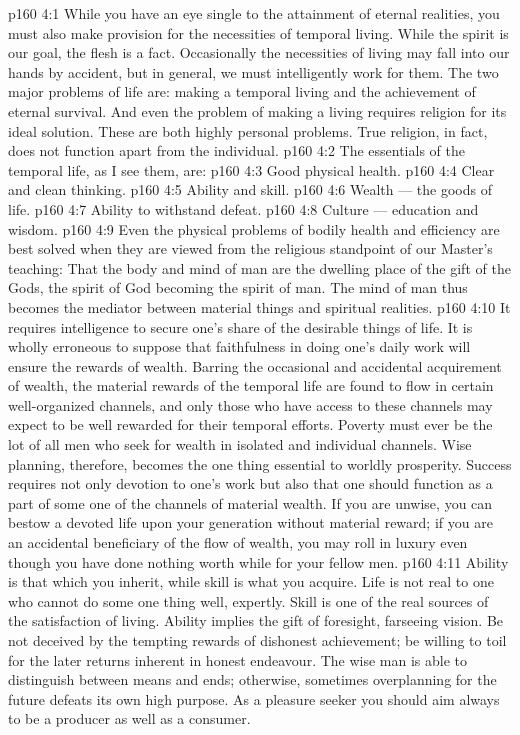 \vs p160 4:1 While you have an eye single to the attainment of eternal realities, you must also make provision for the necessities of temporal living. While the spirit is our goal, the flesh is a fact. Occasionally the necessities of living may fall into our hands by accident, but in general, we must intelligently work for them. The two major problems of life are: making a temporal living and the achievement of eternal survival. And even the problem of making a living requires religion for its ideal solution. These are both highly personal problems. True religion, in fact, does not function apart from the individual.
\vs p160 4:2 \pc The essentials of the temporal life, as I see them, are:
\vs p160 4:3 \bibnobreakspace Good physical health.
\vs p160 4:4 \bibnobreakspace Clear and clean thinking.
\vs p160 4:5 \bibnobreakspace Ability and skill.
\vs p160 4:6 \bibnobreakspace Wealth --- the goods of life.
\vs p160 4:7 \bibnobreakspace Ability to withstand defeat.
\vs p160 4:8 \bibnobreakspace Culture --- education and wisdom.
\vs p160 4:9 \pc Even the physical problems of bodily health and efficiency are best solved when they are viewed from the religious standpoint of our Master’s teaching: That the body and mind of man are the dwelling place of the gift of the Gods, the spirit of God becoming the spirit of man. The mind of man thus becomes the mediator between material things and spiritual realities.
\vs p160 4:10 \pc It requires intelligence to secure one’s share of the desirable things of life. It is wholly erroneous to suppose that faithfulness in doing one’s daily work will ensure the rewards of wealth. Barring the occasional and accidental acquirement of wealth, the material rewards of the temporal life are found to flow in certain well\hyp{}organized channels, and only those who have access to these channels may expect to be well rewarded for their temporal efforts. Poverty must ever be the lot of all men who seek for wealth in isolated and individual channels. Wise planning, therefore, becomes the one thing essential to worldly prosperity. Success requires not only devotion to one’s work but also that one should function as a part of some one of the channels of material wealth. If you are unwise, you can bestow a devoted life upon your generation without material reward; if you are an accidental beneficiary of the flow of wealth, you may roll in luxury even though you have done nothing worth while for your fellow men.
\vs p160 4:11 Ability is that which you inherit, while skill is what you acquire. Life is not real to one who cannot do some one thing well, expertly. Skill is one of the real sources of the satisfaction of living. Ability implies the gift of foresight, farseeing vision. Be not deceived by the tempting rewards of dishonest achievement; be willing to toil for the later returns inherent in honest endeavour. The wise man is able to distinguish between means and ends; otherwise, sometimes overplanning for the future defeats its own high purpose. As a pleasure seeker you should aim always to be a producer as well as a consumer.
